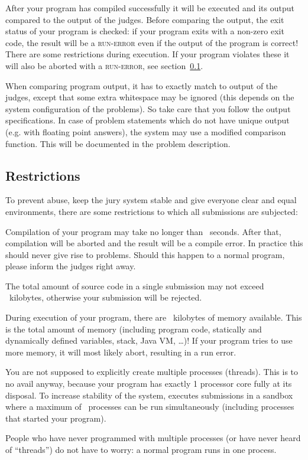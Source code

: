 After your program has compiled successfully it will be executed and
its output compared to the output of the judges. Before comparing the
output, the exit status of your program is checked: if your program
exits with a non-zero exit code, the result will be a \textsc{run-error}
even if the output of the program is correct!
There are some restrictions during execution. If your program violates
these it will also be aborted with a \textsc{run-error},
see section~\ref{runlimits}.

When comparing program output, it has to exactly match to output of
the judges, except that some extra whitespace may be ignored (this
depends on the system configuration of the problems). So take care
that you follow the output specifications. In case of problem
statements which do not have unique output (e.g. with floating point
answers), the system may use a modified comparison function.
This will be documented in the problem description.

\subsection{Restrictions}\label{runlimits}

To prevent abuse, keep the jury system stable and give everyone
clear and equal environments, there are some restrictions to which all
submissions are subjected:

\begin{description}
\item[compile time]
Compilation of your program may take no longer than \COMPILETIME\
seconds. After that, compilation will be aborted and the result will
be a compile error. In practice this should never give rise to
problems. Should this happen to a normal program, please inform the
judges right away.

\item[source size]
The total amount of source code in a single submission may not exceed
\SOURCESIZE\ kilobytes, otherwise your submission will be rejected.

\item[memory]
During execution of your program, there are \MEMLIMIT\ kilobytes of
memory available. This is the total amount of memory (including
program code, statically and dynamically defined variables, stack,
Java VM, \dots)! If your program tries to use more memory, it will
most likely abort, resulting in a run error.

\item[number of processes]
You are not supposed to explicitly create multiple processes (threads). This is
to no avail anyway, because your program has exactly 1 processor core fully
at its disposal. To increase stability of the system, \DOMjudge
executes submissions in a sandbox where a maximum of \PROCLIMIT\ processes
can be run simultaneously (including processes that started your program).

People who have never programmed with multiple processes (or have
never heard of ``threads'') do not have to worry: a normal program
runs in one process.

\end{description}

